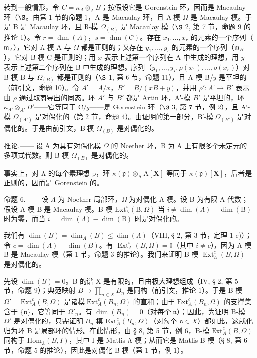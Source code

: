 转到一般情形，令 \(C = \kappa_A \otimes_A B\)；按假设它是 Gorenstein 环，因而是 Macaulay 环（\(\S\)。由第 1 节的命题 1，A 是 Macaulay 环，且 A-模 \(\Omega\) 是 Macaulay 模。于是 B 是 Macaulay 环，且 B-模 \(\Omega_{(B)}\) 是 Macaulay 模（\(\S\) 2, 第 7 节，命题 9 的推论 1）。令 \(r = \dim(A)\)，\(s = \dim(C)\)。存在 \(x_1, \ldots, x_r\) 的元素的一个序列（\(\mathfrak{m}_A\)），它对 A-模 A 与 \(\Omega\) 都是正则的；又存在 \(y_1, \ldots, y_s\) 的元素的一个序列（\(\mathfrak{m}_B\)），它对 B-模 C 是正则的；用 \(x\) 表示上述第一个序列在 A 中生成的理想，用 \(y\) 表示上述第二个序列在 B 中生成的理想。序列（\(y_1, \ldots, y_s, \rho(x_1), \ldots, \rho(x_r)\)）对 B-模 B 与 \(\Omega_{(B)}\) 都是正则的（\(\S\) 1, 第 6 节，命题 11），且 A-模 B/\(y\) 是平坦的（前引文，命题 10）。令 \(A' = A/x\)，\(B' = B/(xB + y)\)，并用 \(\rho': A' \to B'\) 表示由 \(\rho\) 通过取商导出的同态。环 \(A'\) 与 \(B'\) 都是 Artin 环，A′-模 \(B'\) 是平坦的，环 \(\kappa_{A'} \otimes_{A'} B'\)——它等同于 C/\(y\)——是 Gorenstein 环（\(\S\) 3, 第 7 节，例 2），且 A′-模 \(\Omega_{(A')}\) 是对偶化的（第 2 节，命题 4）。由证明的第一部分，B′-模 \(\Omega_{(B')}\) 是对偶化的。于是由前引文，B-模 \(\Omega_{(B)}\) 是对偶化的。

推论.—— 设 A 为具有对偶化模 \(\Omega\) 的 Noether 环，B 为 A 上有限多个未定元的多项式代数。则 B-模 \(\Omega_{(B)}\) 是对偶化的。

事实上，对 A 的每个素理想 p，环 \(\kappa(\mathfrak{p})\otimes_{\mathrm{A}}\mathrm{A}[\mathbf{X}]\) 等同于 \(\kappa(\mathfrak{p})[\mathbf{X}]\)，后者是正则的，因而是 Gorenstein 的。

命题 6.—— 设 \(\Lambda\) 为 Noether 局部环，\(\Omega\) 为对偶化 A-模。设 B 为有限 A-代数；假设 A-模 B 是 Macaulay 模。B-模 \(\mathrm{Ext}_{\mathrm{A}}^{i}(\mathrm{B},\Omega)\) 当 \(i\neq \dim (\Lambda) - \dim (\mathrm{B})\) 时为零，而当 \(i = \dim (\Lambda) - \dim (\mathrm{B})\) 时是对偶化的。

我们有 \(\dim(B) = \dim_{A}(B) \leqslant \dim(\Lambda)\)（VIII, § 2, 第 3 节，定理 1 c)）；令 \(c = \dim(A) - \dim(B)\)。有 \(\operatorname{Ext}_{A}^{i}(B, \Omega) = 0\)（其中 \(i \neq c\)），因为 A-模 B 是 Macaulay 模（第 1 节，命题 3 的推论）。我们来证明 B-模 \(\operatorname{Ext}_{\Lambda}^{c}(B, \Omega)\) 是对偶化的。

先设 \(\dim(B) = 0\)。B 的谱 X 是有限的，且由极大理想组成（IV, § 2, 第 5 节，命题 9）；典范映射 \(B \to \prod_{n \in X} B_n\) 是同构（前引文，推论 1）。于是 B-模 \(\Omega' = \text{Ext}_A^c(B, \Omega)\) 是诸模 \(\text{Ext}_A^c(B_n, \Omega)\) 的直和；由于 \(\text{Ext}_A^c(B_n, \Omega)\) 的支撑集含于 \(\{\mathfrak{n}\}\)，它等同于 \(\Omega'_n\)。有 \(\dim(B_n) = 0\)（对每个 \(\mathfrak{n}\)）；因此，为证明 B-模 \(\Omega'\) 是对偶化的，只需证明 \(B_n\)-模 \(\text{Ext}_A^c(B_n, \Omega)\)（对每个 \(\mathfrak{n} \in X\)）都如此，这就化归为环 B 是局部环的情形。在此情形，由 § 8, 第 5 节，例 6，B-模 \(\text{Ext}_A^c(B, \Omega)\) 同构于 \(\text{Hom}_A(B, I)\)，其中 I 是 Matlis A-模；从而它是 Matlis B-模（§ 8, 第 6 节，命题 5 的推论），因此是对偶化 B-模（第 1 节，例 1）。

